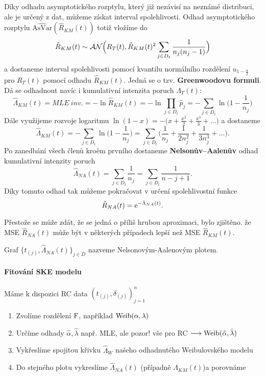 Díky odhadu asymptotického rozptylu, který již nezávisí na neznámé distribuci, ale je určený z dat, můžeme získat interval spolehlivosti. Odhad asymptotického rozptylu $\widehat{\mathrm{AsVar}}(\hat{R}_{KM}(t))$ totiž vložíme do 
$$\hat{R}_{KM}(t) \sim \mathcal{AN}\Big(R_T(t), \hat{R}_{KM}(t)^2 \sum_{j \in D_t} \frac{1}{n_j(n_j -1)} \Big)$$
a dostaneme interval spolehlivosti pomocí kvantilu normálního rozdělení $u_{1-\frac{\alpha}{2}}$ pro $R_T(t)$ pomocí odhadu $\hat{R}_{KM}(t)$. Jedná se o tzv. \textbf{Greenwoodovu formuli}.\\
Dá se odhadnout navíc i kumulativní intenzita poruch $\hat{\Lambda}_T(t)
:$
$$\hat{\Lambda}_{KM}(t)\equal{MLE~inv.} = -\ln \hat{R}_{KM}(t) = -\ln \prod_{j\in D_t} \hat{p}_j = - \sum_{j \in D_t} \ln\Big(1 - \frac{1}{n_j}\Big)$$
Dále využijeme rozvoje logaritmu $\ln(1-x) = -\Big(x + \frac{x^2}{2} +\frac{x^3}{3}+\dots\Big)$
a dostaneme 
$$ \hat{\Lambda}_{KM}(t) = - \sum_{j \in D_t} \ln\Big(1 - \frac{1}{n_j}\Big) = \sum_{j \in D_t} \Big(\frac{1}{n_j} + \frac{1}{2n_j^2} + \frac{1}{3n_j^3} + \dots \Big).$$
Po zanedbání všech členů kroěm prvního dostaneme \textbf{Nelsonův--Aalenův} odhad kumulativní intenzity poruch 
$$\hat{\Lambda}_{NA}(t)  =\sum_{j\in D_t} \frac{1}{n_j} = \sum_{j \in D_t} \frac{1}{n-j+1}.$$
Díky tomuto odhad tak můžeme pokračovat v určení spolehlivostní funkce 
$$ \hat{R}_{NA}(t) =\mathrm{e}^{-\hat{\Lambda}_{NA}(t)}. $$
\begin{remark}
	Přestože se může zdát, že se jedná o příliš hrubou aproximaci, bylo zjištěno. že MSE $\hat{R}_{NA}(t)$ může být v některých případech lepší než MSE $\hat{R}_{KM}(t)$.
\end{remark}
\begin{define}
	Graf $\lbrace t_{(j)}, \hat{\Lambda}_{NA}(t) \rbrace_{j\in D}$ nazveme Nelsonovým-Aalenovým plotem. 
\end{define}
\paragraph{Fitování SKE modelu} Máme k dispozici RC data $(t_{(j)}, \delta_{(j)})_{j=1}^n$
\begin{enumerate}
	\item Zvolíme rozdělení $\mathrm{F}$, například $\mathrm{Weib}(\alpha, \lambda)$
	\item Určíme odhady $\hat{\alpha}, \hat{\lambda}$ např. MLE, ale pozor! vše pro RC $\longrightarrow \mathrm{Weib}(\hat{\alpha},\hat{\lambda} )$
	\item Vykřeslíme spojitou křivku $\hat{\Lambda}_W$ našeho odhadnutého Weibulovského modelu
	\item Do stejného plotu vykreslíme $\hat{\Lambda}_{NA}(t)$ (případně $\hat{\Lambda}_{KM}(t)$)a porovnáme
\end{enumerate}
